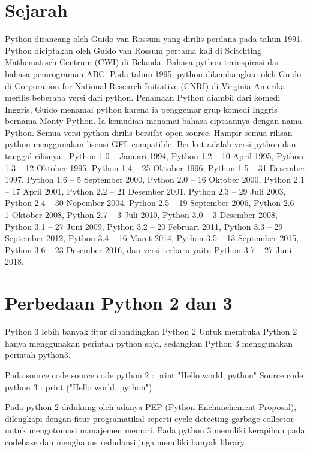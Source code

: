 \documentclass[lipt]{Article}
\begin{document}
\section{Sejarah}
Python dirancang oleh Guido van Rossum yang dirilis perdana pada tahun 1991. Python diciptakan oleh Guido van Rossum pertama kali di Scitchting Mathematisch Centrum (CWI) di Belanda. Bahasa python terinspirasi dari bahasa pemrograman ABC. Pada tahun 1995, python dikembangkan oleh Guido di Corporation for National Research Initiative (CNRI) di Virginia Amerika merilis beberapa versi dari python. Penamaan Python diambil dari komedi Inggris,  Guido menamai python karena ia penggemar grup komedi Inggris bernama Monty Python. Ia kemudian menamai bahasa ciptaannya dengan nama Python.
Semua versi python dirilis bersifat open source. Hampir semua rilisan python menggunakan lisensi GFL-compatible. Berikut adalah versi python dan tanggal rilisnya ; Python 1.0 – Januari 1994, Python 1.2 – 10 April 1995, Python 1.3 – 12 Oktober 1995, Python 1.4 – 25 Oktober 1996, Python 1.5 – 31 Desember 1997, Python 1.6 – 5 September 2000, Python 2.0 – 16 Oktober 2000, Python 2.1 – 17 April 2001, Python 2.2 – 21 Desember 2001, Python 2.3 – 29 Juli 2003, Python 2.4 – 30 Nopember 2004, Python 2.5 – 19 September 2006, Python 2.6 – 1 Oktober 2008, Python 2.7 – 3 Juli 2010, Python 3.0 – 3 Desember 2008, Python 3.1 – 27 Juni 2009, Python 3.2 – 20 Februari 2011, Python 3.3 – 29 September 2012, Python 3.4 – 16 Maret 2014, Python 3.5 – 13 September 2015, Python 3.6 – 23 Desember 2016,  dan versi terbaru yaitu Python 3.7 – 27 Juni 2018. 

\section{Perbedaan Python 2 dan 3}
Python 3 lebih banyak fitur dibandingkan Python 2
Untuk membuka Python 2 hanya menggunakan perintah python saja, sedangkan Python 3 menggunakan perintah python3.

Pada source code
source code python 2 :
print "Hello world, python"
Source code python 3 :
print ("Hello world, python")

Pada python 2 didukung oleh adanya PEP (Python Enchanchement Proposal), dilengkapi dengan fitur programatikal seperti cycle detecting garbage collector untuk mengotomasi manajemen memori.
Pada python 3 memiliki kerapihan pada codebase dan menghapus redudansi juga memiliki banyak library.
\end{document}
